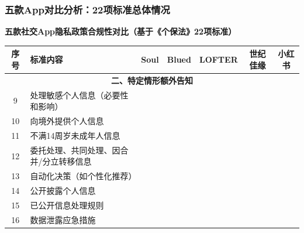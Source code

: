 \documentclass[AutoFakeBold,AutoFakeSlant]{beamer}
\newcommand{\cmark}{\textcolor{green}{\ding{51}}} %
\newcommand{\xmark}{\textcolor{red}{\ding{55}}}  %
\begin{document}
\begin{frame}
	\frametitle{五款App对比分析：22项标准总体情况}
	\scriptsize
	\textbf{五款社交App隐私政策合规性对比（基于《个保法》22项标准）}
	
	\vspace{0.5em}
	\tiny
	\begin{tabularx}{\textwidth}{|c|X|c|c|c|c|c|}
		\toprule
		\textbf{序号} & \textbf{标准内容} & \textbf{Soul} & \textbf{Blued} & \textbf{LOFTER} & \textbf{世纪佳缘} & \textbf{小红书} \\
		\midrule
		\multicolumn{7}{|c|}{\textbf{二、特定情形额外告知}} \\
		\midrule
		9 & 处理敏感个人信息（必要性和影响） & \xmark & \xmark & \xmark & \xmark & \xmark \\
		\midrule
		10 & 向境外提供个人信息 & \xmark & \xmark & \xmark & \cmark & \xmark \\
		\midrule
		11 & 不满14周岁未成年人信息 & \cmark & \cmark & \cmark & \cmark & \cmark \\
		\midrule
		12 & 委托处理、共同处理、因合并/分立转移信息 & \cmark & \cmark & \cmark & \cmark & \cmark \\
		\midrule
		13 & 自动化决策（如个性化推荐） & \xmark & \xmark & \xmark & \xmark & \xmark \\
		\midrule
		14 & 公开披露个人信息 & \cmark & \cmark & \cmark & \cmark & \cmark \\
		\midrule
		15 & 已公开信息处理规则 & \cmark & \cmark & \cmark & \cmark & \cmark \\
		\midrule
		16 & 数据泄露应急措施 & \xmark & \cmark & \xmark & \xmark & \xmark \\
		\bottomrule
	\end{tabularx}
\end{frame}
\end{document}
